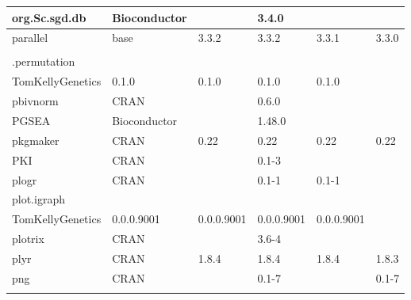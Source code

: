 \begin{longtable}{|llllll|}
org.Sc.sgd.db                 & Bioconductor              &             & 3.4.0       &                &                  \\ \hline
parallel                      & base                      & 3.3.2       & 3.3.2       & 3.3.1          & 3.3.0             \\ \hline \rowcolor{gray!25}
\begin{tabular}[c]{@{}l@{}}pathway.structure\\.permutation \end{tabular} & \begin{tabular}[c]{@{}l@{}}GitHub \\ TomKellyGenetics \end{tabular}  & 0.1.0       & 0.1.0       & 0.1.0          & 0.1.0            \\ \hline
pbivnorm                      & CRAN                      &             & 0.6.0       &                &                   \\ \hline \rowcolor{gray!25}
PGSEA                         & Bioconductor              &             & 1.48.0      &                &                  \\ \hline
pkgmaker                      & CRAN                      & 0.22        & 0.22        & 0.22           & 0.22              \\ \hline \rowcolor{gray!25}
PKI                           & CRAN                      &             & 0.1-3       &                &                  \\ \hline
plogr                         & CRAN                      &             & 0.1-1       & 0.1-1          &                   \\ \hline \rowcolor{gray!25}
plot.igraph                   & \begin{tabular}[c]{@{}l@{}}GitHub \\ TomKellyGenetics \end{tabular}  & 0.0.0.9001  & 0.0.0.9001  & 0.0.0.9001     & 0.0.0.9001       \\ \hline
plotrix                       & CRAN                      &             & 3.6-4       &                &                   \\ \hline \rowcolor{gray!25}
plyr                          & CRAN                      & 1.8.4       & 1.8.4       & 1.8.4          & 1.8.3            \\ \hline
png                           & CRAN                      &             & 0.1-7       &                & 0.1-7             \\ \hline \rowcolor{gray!25}

\end{longtable}
